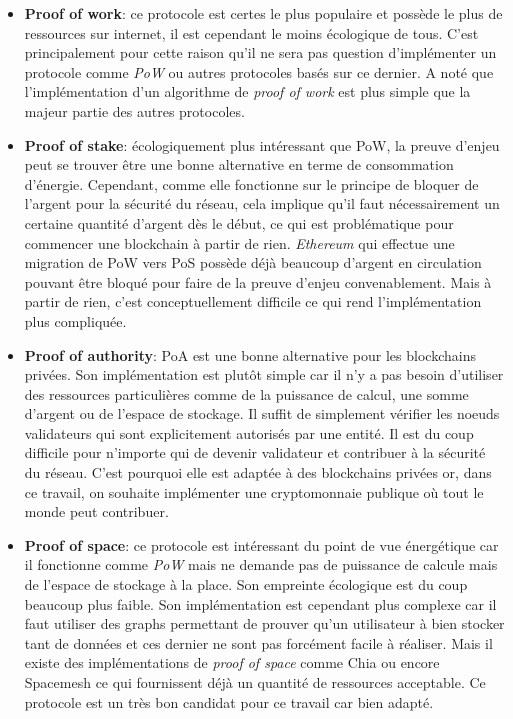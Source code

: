 \begin{itemize}
    \item \textbf{Proof of work}: ce protocole est certes le plus populaire et possède le plus de ressources sur internet, il est cependant le moins écologique de tous. C'est principalement pour cette raison qu'il ne sera pas question d'implémenter un protocole comme \textit{PoW} ou autres protocoles basés sur ce dernier. A noté que l'implémentation d'un algorithme de \textit{proof of work} est plus simple que la majeur partie des autres protocoles.
    \item \textbf{Proof of stake}: écologiquement plus intéressant que PoW, la preuve d'enjeu peut se trouver être une bonne alternative en terme de consommation d'énergie. Cependant, comme elle fonctionne sur le principe de bloquer de l'argent pour la sécurité du réseau, cela implique qu'il faut nécessairement un certaine quantité d'argent dès le début, ce qui est problématique pour commencer une blockchain à partir de rien. \textit{Ethereum} qui effectue une migration de PoW vers PoS possède déjà beaucoup d'argent en circulation pouvant être bloqué pour faire de la preuve d'enjeu convenablement. Mais à partir de rien, c'est conceptuellement difficile ce qui rend l'implémentation plus compliquée.
    \item \textbf{Proof of authority}: PoA est une bonne alternative pour les blockchains privées. Son implémentation est plutôt simple car il n'y a pas besoin d'utiliser des ressources particulières comme de la puissance de calcul, une somme d'argent ou de l'espace de stockage. Il suffit de simplement vérifier les noeuds validateurs qui sont explicitement autorisés par une entité. Il est du coup difficile pour n'importe qui de devenir validateur et contribuer à la sécurité du réseau. C'est pourquoi elle est adaptée à des blockchains privées or, dans ce travail, on souhaite implémenter une cryptomonnaie publique où tout le monde peut contribuer.
    \item \textbf{Proof of space}: ce protocole est intéressant du point de vue énergétique car il fonctionne comme \textit{PoW} mais ne demande pas de puissance de calcule mais de l'espace de stockage à la place. Son empreinte écologique est du coup beaucoup plus faible. Son implémentation est cependant plus complexe car il faut utiliser des graphs permettant de prouver qu'un utilisateur à bien stocker tant de données et ces dernier ne sont pas forcément facile à réaliser. Mais il existe des implémentations de \textit{proof of space} comme Chia ou encore Spacemesh ce qui fournissent déjà un quantité de ressources acceptable. Ce protocole est un très bon candidat pour ce travail car bien adapté.

\end{itemize}
